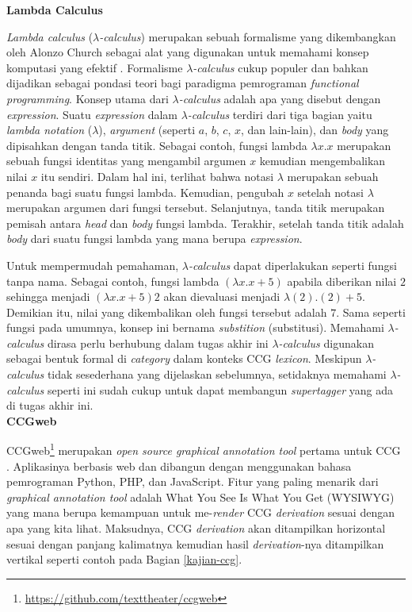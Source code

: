\noindent\textbf{Lambda Calculus}

\textit{Lambda calculus} ({$\lambda$}\textit{-calculus}) merupakan sebuah formalisme yang dikembangkan
oleh Alonzo Church sebagai alat yang digunakan untuk memahami konsep komputasi yang efektif
\citep{DBLP:journals/corr/Rojas15}.
Formalisme {$\lambda$}\textit{-calculus} cukup populer dan bahkan dijadikan sebagai pondasi teori bagi
paradigma pemrograman \textit{functional programming}.
Konsep utama dari {$\lambda$}\textit{-calculus} adalah apa yang disebut dengan \textit{expression}.
Suatu \textit{expression} dalam {$\lambda$}\textit{-calculus} terdiri dari tiga bagian yaitu
\textit{lambda notation} ({$\lambda$}), \textit{argument} (seperti $a$, $b$, $c$, $x$, dan lain-lain),
dan \textit{body} yang dipisahkan dengan tanda titik.
Sebagai contoh, fungsi lambda ${\lambda}x. x$ merupakan sebuah fungsi identitas yang mengambil
argumen $x$ kemudian mengembalikan nilai $x$ itu sendiri.
Dalam hal ini, terlihat bahwa notasi {$\lambda$} merupakan sebuah penanda bagi suatu fungsi lambda.
Kemudian, pengubah $x$ setelah notasi {$\lambda$} merupakan argumen dari fungsi tersebut.
Selanjutnya, tanda titik merupakan pemisah antara \textit{head} dan \textit{body} fungsi lambda.
Terakhir, setelah tanda titik adalah \textit{body} dari suatu fungsi lambda yang mana berupa
\textit{expression}.

Untuk mempermudah pemahaman, {$\lambda$}\textit{-calculus} dapat diperlakukan seperti fungsi tanpa
nama. Sebagai contoh, fungsi lambda $({\lambda}x. x + 5)$ apabila diberikan nilai $2$ sehingga
menjadi $({\lambda}x. x + 5) 2$ akan dievaluasi menjadi ${\lambda}(2). (2) + 5$.
Demikian itu, nilai yang dikembalikan oleh fungsi tersebut adalah $7$.
Sama seperti fungsi pada umumnya, konsep ini bernama \textit{substition} (substitusi).
Memahami {$\lambda$}\textit{-calculus} dirasa perlu berhubung dalam tugas akhir ini
{$\lambda$}\textit{-calculus} digunakan sebagai bentuk formal di \textit{category}
dalam konteks CCG \textit{lexicon}. Meskipun {$\lambda$}\textit{-calculus} tidak sesederhana
yang dijelaskan sebelumnya, setidaknya memahami {$\lambda$}\textit{-calculus} seperti ini
sudah cukup untuk dapat membangun \textit{supertagger} yang ada di tugas akhir ini.
\\


\noindent\textbf{CCGweb}

CCGweb\footnote{\url{https://github.com/texttheater/ccgweb}} merupakan
\textit{open source graphical annotation tool} pertama untuk CCG \citep{evang-etal-2019-ccgweb}.
Aplikasinya berbasis web dan dibangun dengan menggunakan bahasa pemrograman
Python, PHP, dan JavaScript.
Fitur yang paling menarik dari \textit{graphical annotation tool} adalah What You See Is What
You Get (WYSIWYG) yang mana berupa kemampuan untuk me-\textit{render} CCG \textit{derivation}
sesuai dengan apa yang kita lihat.
Maksudnya, CCG \textit{derivation} akan ditampilkan horizontal sesuai dengan panjang kalimatnya
kemudian hasil \textit{derivation}-nya ditampilkan vertikal seperti contoh pada
Bagian \ref{kajian-ccg}.

